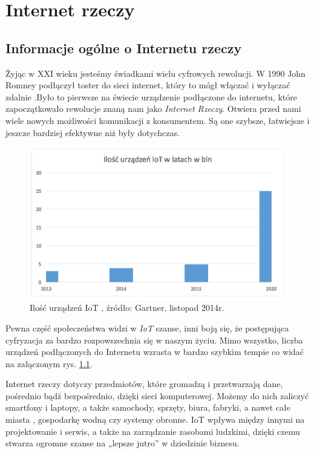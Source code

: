 \documentclass[brudnopis]{xmgr}
\begin{document}
\chapter{Internet rzeczy}


\section{Informacje ogólne o Internetu rzeczy}

Żyjąc w XXI wieku jesteśmy świadkami wielu cyfrowych rewolucji. W 1990 John Romney podłączył toster do sieci internet, który to mógł włączać i wyłączać zdalnie \cite{toster}.Było to pierwsze na świecie urządzenie podłączone do internetu, które zapoczątkowało rewolucje znaną nam jako \emph{Internet Rzeczy}. Otwiera przed nami wiele nowych możliwości komunikacji z konsumentem. Są one szybsze, łatwiejsze i jeszcze bardziej efektywne niż były dotychczas.
\begin{figure}[h]
\centering
\includegraphics[width=\textwidth]{w}
\caption{Ilość urządzeń IoT , źródło: Gartner, listopad 2014r.}
\label{fig:ilosciot}
\end{figure}
 Pewna część społeczeństwa widzi w \emph{IoT} szanse, inni boją się, że postępująca cyfryzacja za bardzo rozpowszechnia się w naszym życiu. Mimo wszystko, liczba urządzeń podłączonych do Internetu wzrasta w bardzo szybkim tempie co widać na załączonym rys. \ref{fig:ilosciot}.

Internet rzeczy dotyczy przedmiotów, które gromadzą i przetwarzają dane, pośrednio bądź bezpośrednio, dzięki sieci komputerowej. Możemy do nich zaliczyć smartfony i laptopy, a także samochody, sprzęty, biura, fabryki, a nawet całe miasta \cite{miasta}, gospodarkę wodną czy systemy obronne. IoT wpływa między innymi na projektowanie i serwis, a także na zarządzanie zasobami ludzkimi, dzięki czemu stwarza ogromne szanse na „lepsze jutro” w dziedzinie biznesu. 
\end{document}
